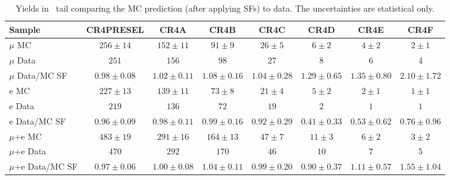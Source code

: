 \begin{table}[!h]
\begin{center}
{\footnotesize
\begin{tabular}{l||c||c|c|c|c|c|c}
\hline
Sample              & CR4PRESEL & CR4A & CR4B & CR4C &
CR4D & CR4E & CR4F\\
\hline
\hline
$\mu$ MC 		  & $256 \pm 14$ & $152 \pm 11$ & $91 \pm 9$ & $26 \pm 5$ & $6 \pm 2$ & $4 \pm 2$ & $2 \pm 1$ \\
$\mu$ Data 		  & $251$ & $156$ & $98$ & $27$ & $8$ & $6$ & $4$ \\
\hline
$\mu$ Data/MC SF 	  & $0.98 \pm 0.08$ & $1.02 \pm 0.11$ & $1.08 \pm 0.16$ & $1.04 \pm 0.28$ & $1.29 \pm 0.65$ & $1.35 \pm 0.80$ & $2.10 \pm 1.72$ \\
\hline
\hline
e MC 		  & $227 \pm 13$ & $139 \pm 11$ & $73 \pm 8$ & $21 \pm 4$ & $5 \pm 2$ & $2 \pm 1$ & $1 \pm 1$ \\
e Data 		  & $219$ & $136$ & $72$ & $19$ & $2$ & $1$ & $1$ \\
\hline
e Data/MC SF 	  & $0.96 \pm 0.09$ & $0.98 \pm 0.11$ & $0.99 \pm 0.16$ & $0.92 \pm 0.29$ & $0.41 \pm 0.33$ & $0.53 \pm 0.62$ & $0.76 \pm 0.96$ \\
\hline
\hline
$\mu$+e MC 		  & $483 \pm 19$ & $291 \pm 16$ & $164 \pm 13$ & $47 \pm 7$ & $11 \pm 3$ & $6 \pm 2$ & $3 \pm 2$ \\
$\mu$+e Data 		  & $470$ & $292$ & $170$ & $46$ & $10$ & $7$ & $5$ \\
\hline
$\mu$+e Data/MC SF 		  & $0.97 \pm 0.06$ & $1.00 \pm 0.08$ & $1.04 \pm 0.11$ & $0.99 \pm 0.20$ & $0.90 \pm 0.37$ & $1.11 \pm 0.57$ & $1.55 \pm 1.04$ \\
\hline
\end{tabular}}
\caption{ Yields in \mt\ tail comparing the MC prediction (after
  applying SFs) to data. The uncertainties are statistical only.
\label{tab:cr4yields}}
\end{center}
\end{table}

